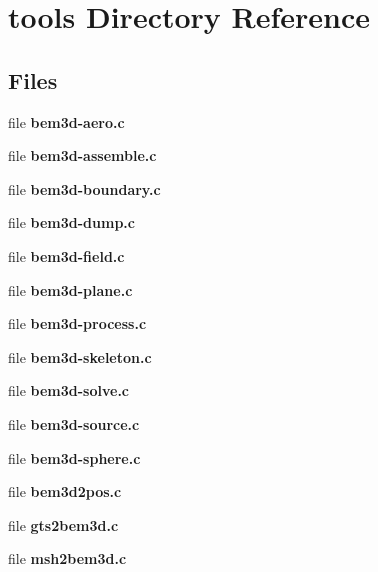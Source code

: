 \section{tools Directory Reference}
\label{dir_4eeb864c4eec08c7d6b9d3b0352cfdde}
\subsection*{Files}
\begin{DoxyCompactItemize}
\item 
file {\bfseries bem3d-\/aero.\+c}
\item 
file {\bfseries bem3d-\/assemble.\+c}
\item 
file {\bfseries bem3d-\/boundary.\+c}
\item 
file {\bfseries bem3d-\/dump.\+c}
\item 
file {\bfseries bem3d-\/field.\+c}
\item 
file {\bfseries bem3d-\/plane.\+c}
\item 
file {\bfseries bem3d-\/process.\+c}
\item 
file {\bfseries bem3d-\/skeleton.\+c}
\item 
file {\bfseries bem3d-\/solve.\+c}
\item 
file {\bfseries bem3d-\/source.\+c}
\item 
file {\bfseries bem3d-\/sphere.\+c}
\item 
file {\bfseries bem3d2pos.\+c}
\item 
file {\bfseries gts2bem3d.\+c}
\item 
file {\bfseries msh2bem3d.\+c}
\end{DoxyCompactItemize}
